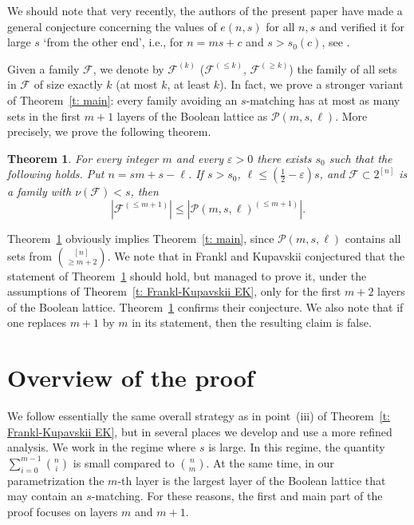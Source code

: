 \documentclass{article}
\newtheorem{theorem}{Theorem}
\begin{document}
We should note that very recently, the authors of the present paper have made a general conjecture concerning the values of $e(n,s)$ for all $n,s$ and verified it for large $s$ `from the other end', i.e., for $n=ms+c$ and $s>s_0(c)$, see \cite{KS2}.

Given a family $\mathcal{F}$, we denote by $\mathcal{F}^{(k)}$ ($\mathcal{F}^{(\leq k)}$, $\mathcal{F}^{(\geq k)}$) the family of all sets in $\mathcal{F}$ of size exactly $k$ (at most $k$, at least $k$). In fact, we prove a stronger variant of Theorem~\ref{t: main}: every family avoiding an $s$-matching has at most as many sets in the first $m+1$ layers of the Boolean lattice as $\mathcal{P}(m,s,\ell)$. More precisely, we prove the following theorem.

\begin{theorem} \label{t: strong main}
    For every integer $m$ and every $\varepsilon > 0$ there exists $s_0$ such that the following holds. Put $n=sm+s-\ell$. If $s > s_0$, $\ell \leq \left(\frac{1}{2} - \varepsilon\right)s$, and $\mathcal{F} \subset 2^{[n]}$ is a family with $\nu(\mathcal{F}) < s$, then
    \[
    |\mathcal{F}^{(\leq m+1)}| \leq |\mathcal{P}(m,s,\ell)^{(\leq m+1)}|.
    \]
\end{theorem}

Theorem~\ref{t: strong main} obviously implies Theorem~\ref{t: main}, since $\mathcal{P}(m,s,\ell)$ contains all sets from ${[n] \choose \geq m + 2}$. We note that in \cite{FK9} Frankl and Kupavskii conjectured that the statement of Theorem~\ref{t: strong main} should hold, but managed to prove it, under the assumptions of Theorem~\ref{t: Frankl-Kupavskii EK}, only for the first $m+2$ layers of the Boolean lattice. Theorem~\ref{t: strong main} confirms their conjecture. We also note that if one replaces $m+1$ by $m$ in its statement, then the resulting claim is false.

\section{Overview of the proof}
We follow essentially the same overall strategy as in point~(iii) of Theorem~\ref{t: Frankl-Kupavskii EK}, but in several places we develop and use a more refined analysis. We work in the regime where $s$ is large. In this regime, the quantity $\sum_{i=0}^{m-1}{n \choose i}$ is small compared to ${n\choose m}$. At the same time, in our parametrization the $m$-th layer is the largest layer of the Boolean lattice that may contain an $s$-matching. For these reasons, the first and main part of the proof focuses on layers $m$ and $m+1$.
\end{document}
